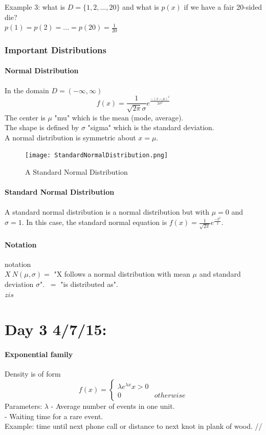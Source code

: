 \documentclass{article}
\newcommand{\p}[1]{\paragraph{#1}} %
\begin{document}
		 Example 3: what is $D = \{1, 2, ..., 20\}$ and what is $p(x)$ if we have a fair 20-sided die? \\
		
		 $p(1) = p(2) = ... = p(20) = \frac{1}{20}$ 
		
		\subsubsection{Important Distributions}
		
		\p{Normal Distribution}
		In the domain $D = (-\infty, \infty)$ 
		\[
			f(x) = \frac{1}{\sqrt{2\pi}\sigma} e^{\frac{-(x-\mu)^2}{2\sigma^2}}
		\]
		 The center is $\mu$ "mu" which is the mean (mode, average). \\
		 The shape is defined by $\sigma$ "sigma" which is the standard deviation.\\
		
		 A normal distribution is symmetric about $x = \mu$.
		
		\begin{figure}[!htb]
			\centering
			\texttt{[image: StandardNormalDistribution.png]}
			\caption{A Standard Normal Distribution}
		\end{figure}
		
		\p{Standard Normal Distribution}
		A standard normal distribution is a normal distribution but with $\mu = 0$ and $\sigma = 1$. In this case, the standard normal equation is $f(x) = \frac{1}{\sqrt{2\pi}} e^{\frac{-2^2}{2}}$.
		
		\p{Notation} notation \\
		 $X ~ N(\mu, \sigma) =$ "X follows a normal distribution with mean $\mu$ and standard deviation $\sigma$". $~ =$ "is distributed as". \\
		
		 $z is$ \\
		
\section{Day 3 4/7/15:}
		
		\p{Exponential family} Density is of form
		\[
			f(x) = \left\{
			\begin{array}{lr}
				\lambda e^{\lambda x} x > 0 \\
				0 & otherwise
			\end{array}
			\right.
		\]
		Parameters: $\lambda$ - Average number of events in one unit. \\
		                                      - Waiting time for a rare event. \\
		Example: time until next phone call or distance to next knot in plank of wood. //
		
\end{document}
